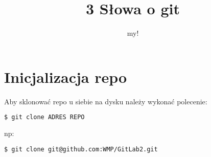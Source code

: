 \documentclass[12pt,a4paper]{report}
\author{my!}
\title{3 Słowa o git}
\begin{document}
\maketitle

\chapter{Inicjalizacja repo}
Aby sklonować repo u siebie na dysku należy wykonać polecenie:
\begin{lstlisting}[language=bash]
  $ git clone ADRES REPO
\end{lstlisting}
np:
\begin{lstlisting}[language=bash]
  $ git clone git@github.com:WMP/GitLab2.git
\end{lstlisting}
\end{document}
